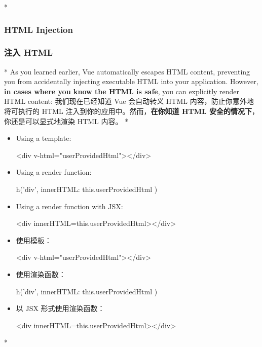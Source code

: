 \begin{paracol}{2} 
 
\switchcolumn[0]*%
\subsubsection{HTML Injection}
\switchcolumn
\subsubsection{注入 HTML}
\switchcolumn[0]*%
As you learned earlier, Vue automatically escapes HTML content,
preventing you from accidentally injecting executable HTML into your
application. However, \textbf{in cases where you know the HTML is safe},
you can explicitly render HTML content:
\switchcolumn
我们现在已经知道 Vue 会自动转义 HTML 内容，防止你意外地将可执行的 HTML
注入到你的应用中。然而，\textbf{在你知道 HTML
安全的情况下}，你还是可以显式地渲染 HTML 内容。
\switchcolumn[0]*%
\begin{itemize}
\item
  Using a template:
\begin{codeHtml}
<div v-html="userProvidedHtml"></div>
\end{codeHtml}
\item
  Using a render function:
\begin{codeJs}
h('div', {
  innerHTML: this.userProvidedHtml
})
\end{codeJs}
\item
  Using a render function with JSX:
\begin{codeHtml}
<div innerHTML={this.userProvidedHtml}></div>
\end{codeHtml}
\end{itemize}
\switchcolumn
\begin{itemize}
\item
  使用模板：
\begin{codeHtml}
<div v-html="userProvidedHtml"></div>
\end{codeHtml}
\item
  使用渲染函数：
\begin{codeJs}
h('div', {
  innerHTML: this.userProvidedHtml
})
\end{codeJs}
\item
  以 JSX 形式使用渲染函数：
\begin{codeHtml}
<div innerHTML={this.userProvidedHtml}></div>
\end{codeHtml}
\end{itemize}
\switchcolumn[0]*%

\end{paracol}
